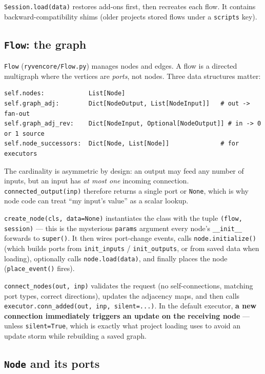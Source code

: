 \documentclass[10pt,a4paper]{article}
\newcommand{\code}[1]{\texttt{\small #1}}
\begin{document}
\code{Session.load(data)} restores add-ons first, then recreates each flow. It contains
backward-compatibility shims (older projects stored flows under a \code{scripts} key).

\subsection{\texttt{Flow}: the graph}

\code{Flow} (\code{ryvencore/Flow.py}) manages nodes and edges. A flow is a directed
multigraph where the vertices are \emph{ports}, not nodes. Three data structures matter:

\begin{lstlisting}
self.nodes:            List[Node]
self.graph_adj:        Dict[NodeOutput, List[NodeInput]]   # out -> fan-out
self.graph_adj_rev:    Dict[NodeInput, Optional[NodeOutput]] # in -> 0 or 1 source
self.node_successors:  Dict[Node, List[Node]]              # for executors
\end{lstlisting}

The cardinality is asymmetric by design: an output may feed any number of inputs, but an
input has \emph{at most one} incoming connection. \code{connected\_output(inp)} therefore
returns a single port or \code{None}, which is why node code can treat ``my input's
value'' as a scalar lookup.

\code{create\_node(cls, data=None)} instantiates the class with the tuple
\code{(flow, session)} --- this is the mysterious \code{params} argument every node's
\code{\_\_init\_\_} forwards to \code{super()}. It then wires port-change events,
calls \code{node.initialize()} (which builds ports from \code{init\_inputs} /
\code{init\_outputs}, or from saved data when loading), optionally calls
\code{node.load(data)}, and finally places the node (\code{place\_event()} fires).

\code{connect\_nodes(out, inp)} validates the request (no self-connections, matching
port types, correct directions), updates the adjacency maps, and then calls
\code{executor.conn\_added(out, inp, silent=...)}. In the default executor,
\textbf{a new connection immediately triggers an update on the receiving node} ---
unless \code{silent=True}, which is exactly what project loading uses to avoid an update
storm while rebuilding a saved graph.

\subsection{\texttt{Node} and its ports}
\end{document}
